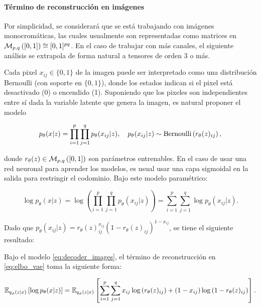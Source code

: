 \paragraph{Término de reconstrucción en imágenes}

Por simplicidad, se considerará que se está trabajando con imágenes monocromáticas, las cuales usualmente son representadas como matrices en $\mathcal{M}_{p,q}\left([0,1]\right)\cong [0,1]^{pq}$. En el caso de trabajar con más canales, el siguiente análisis se extrapola de forma natural a tensores de orden 3 o más.

Cada pixel $x_{ij}\in\{0,1\}$ de la imagen puede ser interpretado como una distribución Bernoulli (con soporte en $\{0,1\}$), donde los estados indican si el pixel está desactivado (0) o encendido (1). Suponiendo que los pixeles son independientes entre sí dada la variable latente que genera la imagen, es natural proponer el modelo

\begin{equation}
    \label{eq:decoder_images}
	p_\theta(x|z)=\prod_{i=1}^p\prod_{j=1}^q p_\theta(x_{ij}|z),
    \quad
	p_\theta(x_{ij}|z) \sim \operatorname{Bernoulli}\left(r_\theta(z)_{ij}\right),
\end{equation}

donde $r_\theta(z)\in\mathcal{M}_{p,q}\left([0,1]\right)$ son parámetros entrenables. En el caso de usar una red neuronal para aprender los modelos, es usual usar una capa sigmoidal en la salida para restringir el codominio. Bajo este modelo paramétrico:

\begin{equation*}
	\log p_\theta(x|z)
    = \log\left(\prod_{i=1}^p\prod_{j=1}^q p_\theta(x_{ij}|z)\right)
    = \sum_{i=1}^p\sum_{j=1}^q \log p_\theta(x_{ij}|z).
\end{equation*}

Dado que $p_\theta(x_{ij}|z) = r_\theta(z)_{ij}^{x_{ij}}(1-r_\theta(z)_{ij})^{1-x_{ij}}$, se tiene el siguiente resultado:

\begin{prop}
	Bajo el modelo \eqref{eq:decoder_images}, el término de reconstrucción en \eqref{eq:elbo_vae} toma la siguiente forma:

	\begin{equation*}
		\mathbb{E}_{q_\phi(z|x)}\left[\log p_\theta(x|z)\right]
        = \mathbb{E}_{q_\phi(z|x)}\left[\sum_{i=1}^p \sum_{j=1}^q x_{ij}\log\left(r_\theta(z)_{ij}\right)+(1-x_{ij})\log\left(1-r_\theta(z)_{ij}\right)\right].
	\end{equation*}
\end{prop}

